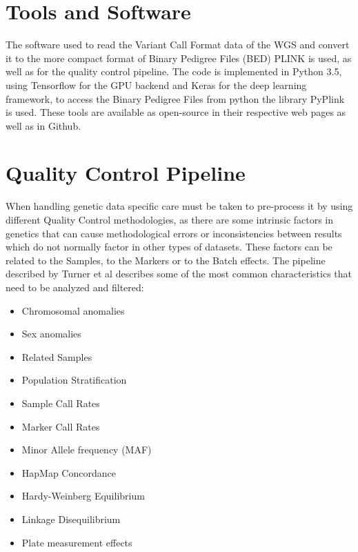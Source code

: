 \section{Tools and Software}

The software used to read the Variant Call Format data of the WGS and convert it to the more compact format of Binary Pedigree Files (BED) PLINK\cite{PLINK}\cite{plink2} is used, as well as for the quality control pipeline.
The code is implemented in Python 3.5, using Tensorflow\cite{tensorflow2015-whitepaper} for the GPU backend and Keras\cite{chollet2015keras} for the deep learning framework, to access the Binary Pedigree Files from python the library PyPlink\cite{pyplink} is used. These tools are available as open-source in their respective web pages as well as in Github.

\section{Quality Control Pipeline}

When handling genetic data specific care must be taken to pre-process it by using different Quality Control methodologies, as there are some intrinsic factors in genetics that can cause methodological errors or inconsistencies between results which do not normally factor in other types of datasets. These factors can be related to the Samples, to the Markers or to the Batch effects. The pipeline described by Turner et al \cite{Pipeline} describes some of the most common characteristics that need to be analyzed and filtered:

\begin{itemize}
    \item{Chromosomal anomalies}
    \item{Sex anomalies}
    \item{Related Samples}
    \item{Population Stratification}
    \item{Sample Call Rates}
    \item{Marker Call Rates}
    \item{Minor Allele frequency (MAF)}
    \item{HapMap Concordance}
    \item{Hardy-Weinberg Equilibrium}
    \item{Linkage Disequilibrium }
    \item{Plate measurement effects}
    
\end{itemize}

